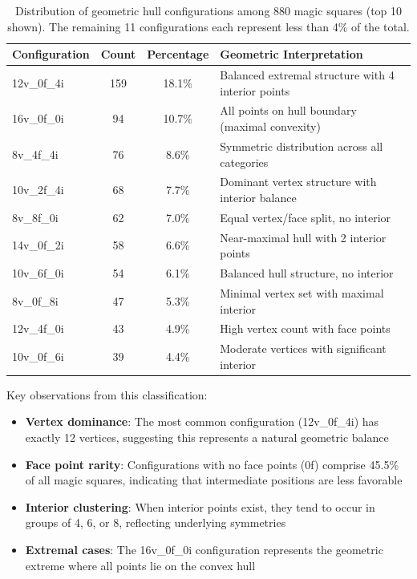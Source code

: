 \begin{table}[h]
\centering
\begin{tabular}{lccp{5cm}}
\toprule
Configuration & Count & Percentage & Geometric Interpretation \\
\midrule
12v\_0f\_4i & 159 & 18.1\% & Balanced extremal structure with 4 interior points \\
16v\_0f\_0i & 94 & 10.7\% & All points on hull boundary (maximal convexity) \\
8v\_4f\_4i & 76 & 8.6\% & Symmetric distribution across all categories \\
10v\_2f\_4i & 68 & 7.7\% & Dominant vertex structure with interior balance \\
8v\_8f\_0i & 62 & 7.0\% & Equal vertex/face split, no interior \\
14v\_0f\_2i & 58 & 6.6\% & Near-maximal hull with 2 interior points \\
10v\_6f\_0i & 54 & 6.1\% & Balanced hull structure, no interior \\
8v\_0f\_8i & 47 & 5.3\% & Minimal vertex set with maximal interior \\
12v\_4f\_0i & 43 & 4.9\% & High vertex count with face points \\
10v\_0f\_6i & 39 & 4.4\% & Moderate vertices with significant interior \\
\bottomrule
\end{tabular}
\caption{Distribution of geometric hull configurations among 880 magic squares (top 10 shown). The remaining 11 configurations each represent less than 4\% of the total.}
\label{tab:geom-classification}
\end{table}

Key observations from this classification:

\begin{itemize}
    \item \textbf{Vertex dominance}: The most common configuration (12v\_0f\_4i) has exactly 12 vertices, suggesting this represents a natural geometric balance
    \item \textbf{Face point rarity}: Configurations with no face points (0f) comprise 45.5\% of all magic squares, indicating that intermediate positions are less favorable
    \item \textbf{Interior clustering}: When interior points exist, they tend to occur in groups of 4, 6, or 8, reflecting underlying symmetries
    \item \textbf{Extremal cases}: The 16v\_0f\_0i configuration represents the geometric extreme where all points lie on the convex hull
\end{itemize}

